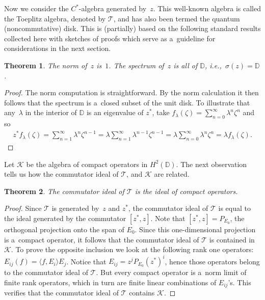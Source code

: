 \documentclass[11pt]{article}
\numberwithin{equation}{section}
\newtheorem{Theorem}{Theorem}[section]
\begin{document}
Now we consider the $C^*$-algebra generated by~$z$.
This well-known algebra is called the Toeplitz algebra, denoted by $\mathcal{T}$, and has also been termed the quantum
(noncommutative) disk.
This is (partially) based on the following standard results collected here with sketches of proofs which serve as
a~guideline for considerations in the next section.

\begin{Theorem}
The norm of~$z$ is~$1$.
The spectrum of~$z$ is all of ${\mathbb D}$, i.e.,~$\sigma(z)={\mathbb D}$.
\end{Theorem}

\begin{proof}
The norm computation is straightforward.
By the norm calculation it then follows that the spectrum is a~closed subset of the unit disk.
To illustrate that any~$\lambda$ in the interior of ${\mathbb D}$ is an eigenvalue of $z^*$, take $f_\lambda(\zeta) =
\sum\limits_{n=0}^\infty \lambda^n \zeta^n$ and so
\begin{gather*}
z^*f_\lambda(\zeta)=\sum\limits_{n=1}^\infty \lambda^n \zeta^{n-1}=\lambda\sum\limits_{n=1}^\infty
\lambda^{n-1}\zeta^{n-1}=\lambda\sum\limits_{n=0}^\infty \lambda^n\zeta^n=\lambda f_\lambda(\zeta).\tag*{\qed}
\end{gather*}
\renewcommand{\qed}{}
\end{proof}

Let $\mathcal{K}$ be the algebra of compact operators in $H^2({\mathbb D})$.
The next observation tells us how the commutator ideal of $\mathcal{T}$, and $\mathcal{K}$ are related.

\begin{Theorem}
The commutator ideal of $\mathcal{T}$ is the ideal of compact operators.
\end{Theorem}

\begin{proof}
Since $\mathcal{T}$ is generated by~$z$ and $z^*$, the commutator ideal of $\mathcal{T}$ is equal to the ideal generated
by the commutator $[z^*,z]$.
Note that $[z^*,z]=P_{E_0}$, the orthogonal projection onto the span of $E_0$.
Since this one-dimensional projection is a~compact operator, it follows that the commutator ideal of $\mathcal{T}$ is
contained in $\mathcal{K}$.
To prove the opposite inclusion we look at the following rank one operators: $E_{ij}(f)=\langle f, E_i\rangle E_j$.
Notice that $E_{ij}=z^jP_{E_0}(z^*)^i$, hence those operators belong to the commutator ideal of $\mathcal{T}$.
But every compact operator is a~norm limit of f\/inite rank operators, which in turn are f\/inite linear combinations of
$E_{ij}$'s.
This verif\/ies that the commutator ideal of $\mathcal{T}$ contains $\mathcal{K}$.
\end{proof}
\end{document}
